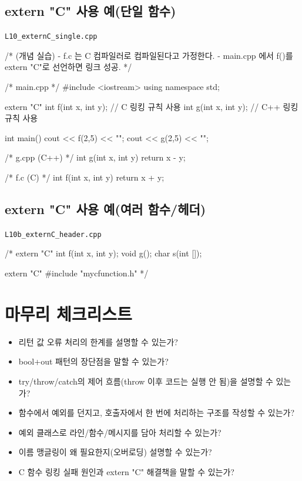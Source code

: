 \documentclass[11pt,a4paper]{article}
\newcommand{\filetag}[1]{\texttt{\color{Accent}#1}}
\begin{document}
\subsection*{extern "C" 사용 예(단일 함수)}
\noindent\filetag{L10\_externC\_single.cpp}
\begin{cppcode}
/*
(개념 실습)
- f.c 는 C 컴파일러로 컴파일된다고 가정한다.
- main.cpp 에서 f()를 extern "C"로 선언하면 링크 성공.
*/

/* main.cpp */
#include <iostream>
using namespace std;

extern "C" int f(int x, int y); // C 링킹 규칙 사용
int g(int x, int y);            // C++ 링킹 규칙 사용

int main() {
    cout << f(2,5) << "\n";
    cout << g(2,5) << "\n";
}

/* g.cpp (C++) */
int g(int x, int y) { return x - y; }

/* f.c (C) */
int f(int x, int y) { return x + y; }
\end{cppcode}

\subsection*{extern "C" 사용 예(여러 함수/헤더)}
\noindent\filetag{L10b\_externC\_header.cpp}
\begin{cppcode}
/*
extern "C" {
    int f(int x, int y);
    void g();
    char s(int []);
}

extern "C" {
#include "mycfunction.h"
}
*/
\end{cppcode}

\section*{마무리 체크리스트}
\begin{GoalBox}
\begin{itemize}[leftmargin=18pt]
  \item 리턴 값 오류 처리의 한계를 설명할 수 있는가?
  \item bool+out 패턴의 장단점을 말할 수 있는가?
  \item try/throw/catch의 제어 흐름(throw 이후 코드는 실행 안 됨)을 설명할 수 있는가?
  \item 함수에서 예외를 던지고, 호출자에서 한 번에 처리하는 구조를 작성할 수 있는가?
  \item 예외 클래스로 라인/함수/메시지를 담아 처리할 수 있는가?
  \item 이름 맹글링이 왜 필요한지(오버로딩) 설명할 수 있는가?
  \item C 함수 링킹 실패 원인과 extern "C" 해결책을 말할 수 있는가?
\end{itemize}
\end{GoalBox}
\end{document}
